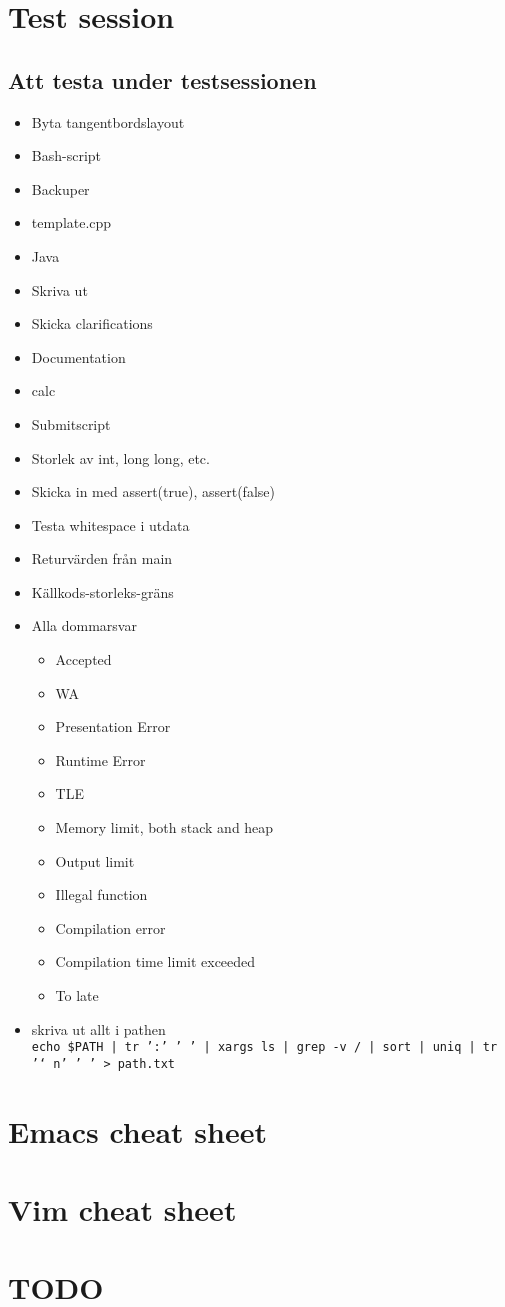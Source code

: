 
\appendix

\chapter{Test session}

\section{Att testa under testsessionen}
\begin{itemize}
	\item Byta tangentbordslayout
	\item Bash-script
	\item Backuper
	\item template.cpp
	\item Java
	\item Skriva ut
	\item Skicka clarifications
	\item Documentation
	\item calc
	\item Submitscript
	\item Storlek av int, long long, etc.
	\item Skicka in med assert(true), assert(false)
	\item Testa whitespace i utdata
	\item Returvärden från main
	\item Källkods-storleks-gräns
	\item Alla dommarsvar
		\begin{itemize}
 			\item Accepted
 			\item WA
			\item Presentation Error
 			\item Runtime Error
 			\item TLE
 			\item Memory limit, both stack and heap
 			\item Output limit
 			\item Illegal function
 			\item Compilation error
 			\item Compilation time limit exceeded
 			\item To late
		\end{itemize}
	\item skriva ut allt i pathen\\
		\texttt{echo \$PATH | tr ':' ' ' | xargs ls | grep -v / | sort | uniq | tr '\char`\\n' ' ' > path.txt}
\end{itemize}

\chapter{Emacs cheat sheet}

\chapter{Vim cheat sheet}

\chapter{TODO}
